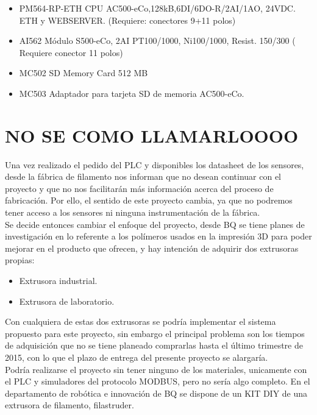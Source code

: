 \begin{itemize}
	\item{PM564-RP-ETH CPU AC500-eCo,128kB,6DI/6DO-R/2AI/1AO, 24VDC. ETH y WEBSERVER. (Requiere: conectores 9+11 polos)}
	\item{AI562 Módulo S500-eCo, 2AI PT100/1000, Ni100/1000, Resist. 150/300 ( Requiere conector 11 polos)}
	\item{MC502 SD Memory Card 512 MB}
	\item{MC503 Adaptador para tarjeta SD de memoria AC500-eCo.}
\end{itemize}

\section{NO SE COMO LLAMARLOOOO}
\label{}

Una vez realizado el pedido del PLC y disponibles los datasheet de los sensores, desde la fábrica de filamento nos informan que no desean continuar con el proyecto y que no nos facilitarán más información acerca del proceso de fabricación. Por ello, el sentido de este proyecto cambia, ya que no podremos tener acceso a los sensores ni ninguna instrumentación de la fábrica.\\

Se decide entonces cambiar el enfoque del proyecto, desde BQ se tiene planes de investigación en lo referente a los polímeros usados en la impresión 3D para poder mejorar en el producto que ofrecen, y hay intención de adquirir dos extrusoras propias:

\begin{itemize}
		\item{Extrusora industrial.}
		\item{Extrusora de laboratorio.}
\end{itemize}

Con cualquiera de estas dos extrusoras se podría implementar el sistema propuesto para este proyecto, sin embargo el principal problema son los tiempos de adquisición que no se tiene planeado comprarlas hasta el último trimestre de 2015, con lo que el plazo de entrega del presente proyecto se alargaría.\\

Podría realizarse el proyecto sin tener ninguno de los materiales, unicamente con el PLC y simuladores del protocolo MODBUS, pero no sería algo completo. En el departamento de robótica e innovación de BQ se dispone de un KIT DIY de una extrusora de filamento, filastruder.\\

